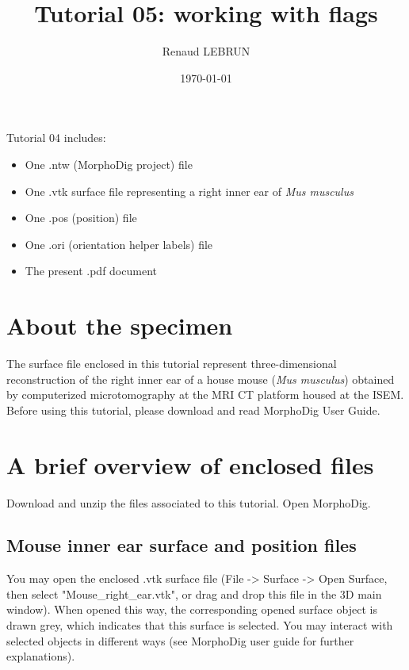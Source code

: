 \documentclass[12pt, a4paper]{book}
\title{Tutorial 05: working with flags}
\author{Renaud LEBRUN}
\affil{Institut des Sciences de l'Evolution, Université de Montpellier, France}
\date{\today}
\begin{document}
	\dominitoc

\maketitle


\faketableofcontents



\minitoc 
Tutorial 04 includes:
\begin{itemize}
\item One .ntw (MorphoDig project) file
\item One .vtk surface file representing a right inner ear of \textit{Mus musculus}
\item One .pos (position) file 
\item One .ori (orientation helper labels) file 
\item The present .pdf document
\end{itemize}





\section{About the specimen}

The surface file enclosed in this tutorial represent three-dimensional reconstruction of the right inner ear of a house mouse (\textit{Mus musculus}) obtained by computerized microtomography at the MRI \si{\micro} CT platform housed at the ISEM.\\
Before using this tutorial, please download and read MorphoDig User Guide.


\section{A brief overview of enclosed files}
		Download and unzip the files associated to this tutorial. Open MorphoDig.
\subsection{Mouse inner ear surface and position files}
	You may open the enclosed .vtk surface file (File -> Surface -> Open Surface, then select "Mouse\_right\_ear.vtk", or drag and drop this file in the 3D main window). When opened
this way, the corresponding opened surface object is drawn grey, which indicates that this surface
is selected. You may interact with selected objects in different ways (see MorphoDig user guide for
further explanations).\\
\end{document}
